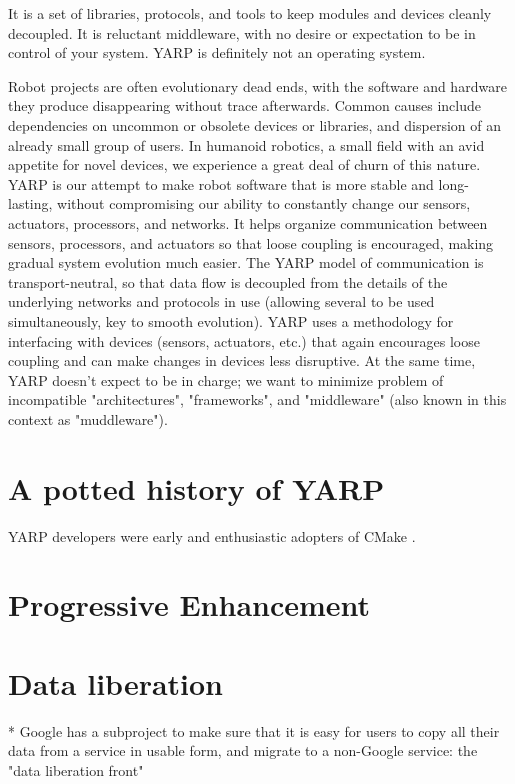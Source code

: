 \documentclass[letterpaper]{article}
\begin{document}
It is a set of libraries, protocols, and tools to keep modules and devices cleanly decoupled. It is reluctant middleware, with no desire or expectation to be in control of your system. YARP is definitely not an operating system.

Robot projects are often evolutionary dead ends, with the software and hardware they produce disappearing without trace afterwards. Common causes include dependencies on uncommon or obsolete devices or libraries, and dispersion of an already small group of users. In humanoid robotics, a small field with an avid appetite for novel devices, we experience a great deal of churn of this nature. YARP is our attempt to make robot software that is more stable and long-lasting, without compromising our ability to constantly change our sensors, actuators, processors, and networks. It helps organize communication between sensors, processors, and actuators so that loose coupling is encouraged, making gradual system evolution much easier. The YARP model of communication is transport-neutral, so that data flow is decoupled from the details of the underlying networks and protocols in use (allowing several to be used simultaneously, key to smooth evolution). YARP uses a methodology for interfacing with devices (sensors, actuators, etc.) that again encourages loose coupling and can make changes in devices less disruptive. At the same time, YARP doesn't expect to be in charge; we want to minimize problem of incompatible "architectures", "frameworks", and "middleware" (also known in this context as "muddleware").

\section{A potted history of YARP}

YARP developers were early and enthusiastic adopters of CMake
 \cite{fitzpatrick10cmaking}.

\section{Progressive Enhancement}

\section{Data liberation}

* Google has a subproject to make sure that it is easy for users to copy all their data from a service in usable form, and migrate to a non-Google service: the "data liberation front"
\end{document}
